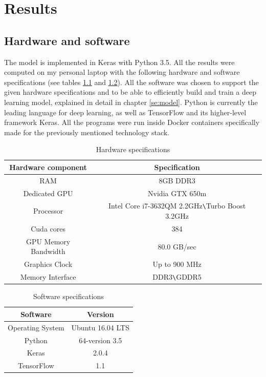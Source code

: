 \documentclass[times, utf8, diplomski]{fer}
\begin{document}
\chapter{Results}

\section{Hardware and software}
The model is implemented in Keras with Python 3.5. All the results were computed on my personal laptop with the following hardware and software specifications (see tables \ref{tb:hardware_specifications} and \ref{tb:software_specifications}). All the software was chosen to support the given hardware specifications and to be able to efficiently build and train a deep learning model, explained in detail in chapter \ref{se:model}. Python is currently the leading language for deep learning, as well as TensorFlow and its higher-level framework Keras. All the programs were run inside Docker containers specifically made for  the previously mentioned technology stack.

\begin{table}
\centering
\caption{Hardware specifications}
\label{tb:hardware_specifications}
\begin{tabular}{cc}
\hline 
Hardware component & Specification \\ \hline 
RAM & 8GB DDR3 \\ 
Dedicated GPU & Nvidia GTX 650m \\ 
Processor & Intel Core i7-3632QM 2.2GHz\texttt{\textbackslash}Turbo Boost 3.2GHz\\
Cuda cores & 384 \\
GPU Memory Bandwidth & 80.0 GB/sec\\
Graphics Clock & Up to 900 MHz \\
Memory Interface & DDR3\texttt{\textbackslash}GDDR5 \\
\hline 
\end{tabular} 
\end{table}

\begin{table}
\centering
\caption{Software specifications}
\label{tb:software_specifications}
\begin{tabular}{cc}
\hline 
Software & Version \\ \hline 
Operating System & Ubuntu 16.04 LTS \\ 
Python & 64-version 3.5 \\ 
Keras & 2.0.4 \\
TensorFlow & 1.1 \\
\hline 
\end{tabular} 
\end{table}
\end{document}
